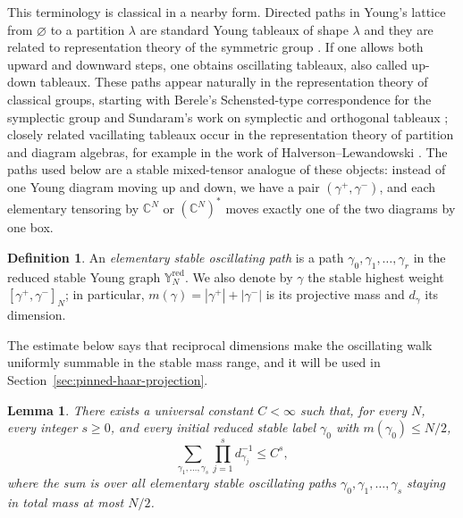 \documentclass[11pt,a4paper,reqno]{amsart}
\newtheorem{lemma}[theorem]{Lemma}
\theoremstyle{definition}
\newtheorem{definition}[theorem]{Definition}
\theoremstyle{remark}
\newcommand\C{{\mathbb C}}
\begin{document}
This terminology is classical in a nearby form.  Directed paths in Young's lattice from $\varnothing$ to a partition $\lambda$ are standard Young tableaux of shape $\lambda$ and they are related to representation theory of the symmetric group \cite{Sag01}. If one allows both upward and downward steps, one obtains oscillating tableaux, also called up-down tableaux.  These paths appear naturally in the representation theory of classical groups, starting with Berele's Schensted-type correspondence for the symplectic group \cite{Ber86} and Sundaram's work on symplectic and orthogonal tableaux \cite{Sun90a,Sun90b}; closely related vacillating tableaux occur in the representation theory of partition and diagram algebras, for example in the work of Halverson--Lewandowski \cite{HalLew05}.  The paths used below are a stable mixed-tensor analogue of these objects: instead of one Young diagram moving up and down, we have a pair $(\gamma^+,\gamma^-)$, and each elementary tensoring by $\C^N$ or $(\C^N)^*$ moves exactly one of the two diagrams by one box.

\begin{definition}\label{def:oscillating-path}
An \emph{elementary stable oscillating path} is a path $\gamma_0,\gamma_1,\ldots,\gamma_r$ in the reduced stable Young graph $\mathbb Y_N^{\mathrm{red}}$. We also denote by $\gamma$ the stable highest weight $[\gamma^+,\gamma^-]_N$; in particular, $m(\gamma)=|\gamma^+|+|\gamma^-|$ is its projective mass and $d_\gamma$ its dimension.
\end{definition}

The estimate below says that reciprocal dimensions make the oscillating walk uniformly summable in the stable mass range, and it will be used in Section~\ref{sec:pinned-haar-projection}.

\begin{lemma}\label{lem:oscillating-path}
There exists a universal constant $C<\infty$ such that, for every $N$, every integer $s\ge0$, and every initial reduced stable label $\gamma_0$ with $m(\gamma_0)\le N/2$,
\begin{equation}\label{eq:oscillating-bound}
\sum_{\gamma_1,\ldots,\gamma_s}\prod_{j=1}^s d_{\gamma_j}^{-1}\le C^s,
\end{equation}
where the sum is over all elementary stable oscillating paths
$\gamma_0,\gamma_1,\ldots,\gamma_s$ staying in total mass at most $N/2$.
\end{lemma}
\end{document}
